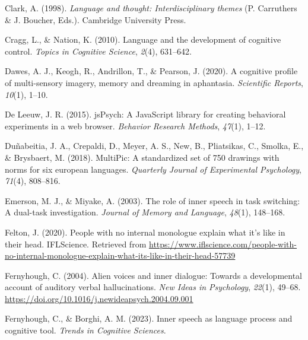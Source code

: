 \documentclass[
  man,a4paper,floatsintext]{apa6}
\newlength{\cslhangindent}
\newlength{\cslentryspacingunit} %
\newenvironment{CSLReferences}[2] %
 {%
  \setlength{\parindent}{0pt}
  \ifodd #1
  \let\oldpar\par
  \def\par{\hangindent=\cslhangindent\oldpar}
  \fi
  \setlength{\parskip}{#2\cslentryspacingunit}
 }%
 {}
\begin{document}
\begin{CSLReferences}{1}{0}
\leavevmode{}%
Clark, A. (1998). \emph{Language and thought: Interdisciplinary themes} (P. Carruthers \& J. Boucher, Eds.). Cambridge University Press.

\leavevmode{}%
Cragg, L., \& Nation, K. (2010). Language and the development of cognitive control. \emph{Topics in Cognitive Science}, \emph{2}(4), 631--642.

\leavevmode{}%
Dawes, A. J., Keogh, R., Andrillon, T., \& Pearson, J. (2020). A cognitive profile of multi-sensory imagery, memory and dreaming in aphantasia. \emph{Scientific Reports}, \emph{10}(1), 1--10.

\leavevmode{}%
De Leeuw, J. R. (2015). jsPsych: A JavaScript library for creating behavioral experiments in a web browser. \emph{Behavior Research Methods}, \emph{47}(1), 1--12.

\leavevmode{}%
Duñabeitia, J. A., Crepaldi, D., Meyer, A. S., New, B., Pliatsikas, C., Smolka, E., \& Brysbaert, M. (2018). MultiPic: A standardized set of 750 drawings with norms for six european languages. \emph{Quarterly Journal of Experimental Psychology}, \emph{71}(4), 808--816.

\leavevmode{}%
Emerson, M. J., \& Miyake, A. (2003). The role of inner speech in task switching: A dual-task investigation. \emph{Journal of Memory and Language}, \emph{48}(1), 148--168.

\leavevmode{}%
Felton, J. (2020). People with no internal monologue explain what it's like in their head. IFLScience. Retrieved from \url{https://www.iflscience.com/people-with-no-internal-monologue-explain-what-its-like-in-their-head-57739}

\leavevmode{}%
Fernyhough, C. (2004). Alien voices and inner dialogue: Towards a developmental account of auditory verbal hallucinations. \emph{New Ideas in Psychology}, \emph{22}(1), 49--68. \url{https://doi.org/10.1016/j.newideapsych.2004.09.001}

\leavevmode{}%
Fernyhough, C., \& Borghi, A. M. (2023). Inner speech as language process and cognitive tool. \emph{Trends in Cognitive Sciences}.


\end{CSLReferences}
\end{document}
